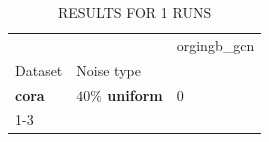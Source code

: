\begin{table}
\caption{RESULTS FOR 1 RUNS}
\begin{tabular}{lll}
\toprule
 &  & orgingb_gcn \\
Dataset & Noise type &  \\
\midrule
\textbf{cora} & \textbf{$ 40 \% $ uniform} & 0 \\
\cline{1-3}
\bottomrule
\end{tabular}
\end{table}
